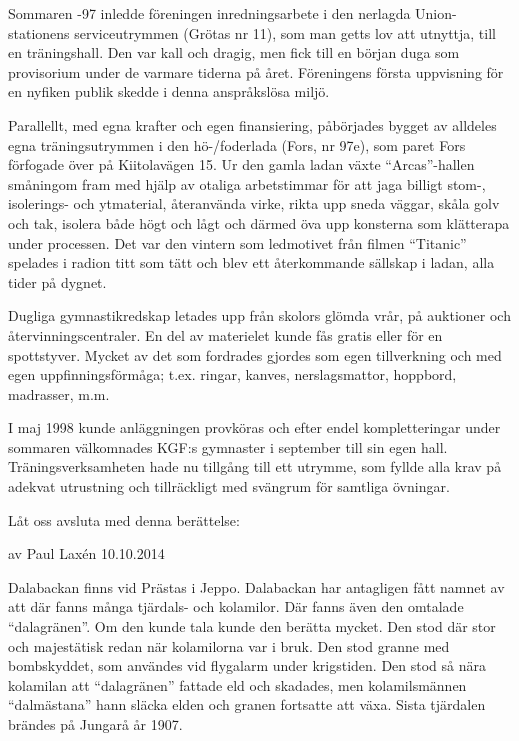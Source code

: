 Sommaren -97 inledde föreningen inredningsarbete i den nerlagda Union-stationens serviceutrymmen (Grötas nr 11), som man getts lov att utnyttja, till en träningshall. Den var kall och dragig, men fick till en början duga som provisorium under de varmare tiderna på året. Föreningens första uppvisning för en nyfiken publik skedde i denna anspråkslösa miljö.

Parallellt, med egna krafter och egen finansiering, påbörjades bygget av alldeles egna träningsutrymmen i den hö-/foderlada (Fors, nr 97e), som paret Fors förfogade över på Kiitolavägen 15. Ur den gamla ladan växte ``Arcas''-hallen småningom fram med hjälp av otaliga arbetstimmar för att jaga billigt stom-, isolerings- och ytmaterial, återanvända virke, rikta upp sneda väggar, skåla golv och tak, isolera både högt och lågt och därmed öva upp konsterna som klätterapa under processen. Det var den vintern som ledmotivet från filmen ``Titanic'' spelades i radion titt som tätt och blev ett återkommande sällskap i ladan, alla tider på dygnet.


Dugliga gymnastikredskap letades upp från skolors glömda vrår, på auktioner och återvinningscentraler. En del av materielet kunde fås gratis eller för en spottstyver. Mycket av det som fordrades gjordes som egen tillverkning och med egen uppfinningsförmåga; t.ex. ringar, kanves, nerslagsmattor, hoppbord, madrasser, m.m.

I maj 1998 kunde anläggningen provköras och efter endel kompletteringar under sommaren välkomnades KGF:s gymnaster i september till sin egen hall. Träningsverksamheten hade nu tillgång till ett utrymme, som fyllde alla krav på adekvat utrustning och tillräckligt med svängrum för samtliga övningar.





Låt oss avsluta med denna berättelse:


av Paul Laxén 10.10.2014

Dalabackan finns vid Prästas i Jeppo. Dalabackan har antagligen fått namnet av att där fanns många tjärdals- och kolamilor. Där fanns även den omtalade ``dalagränen''. Om den kunde tala kunde den berätta mycket. Den stod där stor och majestätisk redan när kolamilorna var i bruk. Den stod granne med bombskyddet, som användes vid flygalarm under krigstiden. Den stod så nära kolamilan att ``dalagränen'' fattade eld och skadades, men kolamilsmännen ``dalmästana'' hann släcka elden och granen fortsatte att växa. Sista tjärdalen brändes på Jungarå år 1907.

